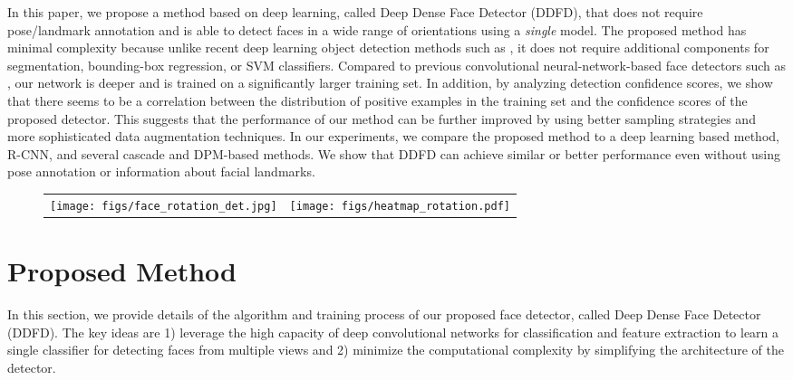 \documentclass{sig-alternate-2013}
\begin{document}
In this paper, we propose a method based on deep learning, called Deep Dense Face Detector (DDFD), that does not require pose/landmark annotation and is able to detect faces in  a wide range of orientations using a \textit{single} model. The proposed method has minimal complexity because unlike recent deep learning object detection methods such as \cite{rcnn}, it does not require additional components for segmentation, bounding-box regression, or SVM classifiers. Compared to previous convolutional neural-network-based face detectors such as \cite{Garcia04}, our network is deeper and is trained on a significantly larger training set. 
In addition, by analyzing detection confidence scores, we show that there seems to be a correlation between the distribution of positive examples in the training set and the confidence scores of the proposed detector. This suggests that the performance of our method can be further improved by using better sampling strategies and more sophisticated data augmentation techniques. In our experiments, we compare the proposed method to a deep learning based method, R-CNN, and several cascade and DPM-based methods. We show that DDFD can achieve similar or better performance even without using pose annotation or information about facial landmarks.



\begin{figure*}[t]
  \centering
	\begin{tabular}{cc}
        \texttt{[image: figs/face\_rotation\_det.jpg]} &
        \texttt{[image: figs/heatmap\_rotation.pdf]}
    \end{tabular}
  \caption{}
  \label{fig:heat_map}
\end{figure*}

\section{Proposed Method}
\label{sec:proposed_method}
In this section, we provide details of the algorithm and training process of our proposed face detector, called Deep Dense Face Detector (DDFD). The key ideas are 1) leverage the high capacity of deep convolutional networks for classification and feature extraction to learn a single classifier for detecting faces from multiple views and 2) minimize the computational complexity by simplifying the architecture of the detector.
\end{document}
